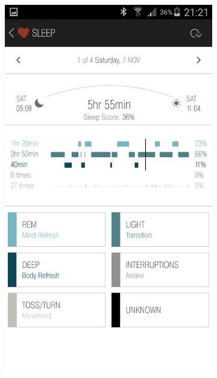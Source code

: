 \documentclass[12pt,a4paper]{article}
\begin{document}
\newpage

\begin{figure}[H]
    \begin{subfigure}[b]{0.5\textwidth}
        \includegraphics[width=\textwidth]{07-11-15-1.png}
     \end{subfigure}
    ~ %
    \begin{subfigure}[b]{0.5\textwidth}

\end{subfigure}
\end{figure}
\end{document}
